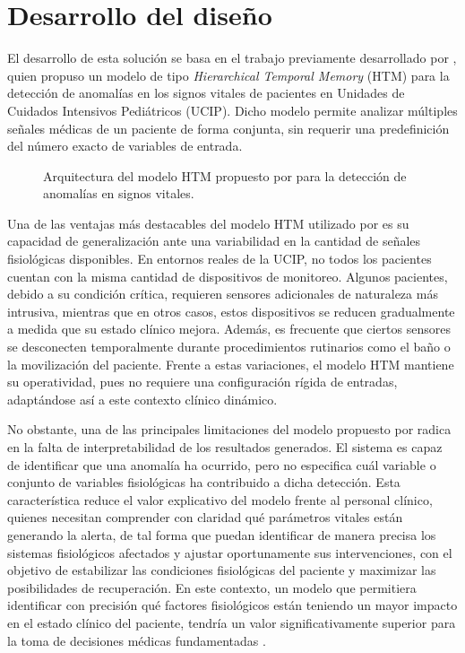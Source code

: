 \chapter{Desarrollo del diseño}

El desarrollo de esta solución se basa en el trabajo previamente desarrollado por \textcite{Vargas2023}, quien propuso un modelo de tipo \textit{Hierarchical Temporal Memory }(HTM) para la detección de anomalías en los signos vitales de pacientes en Unidades de Cuidados Intensivos Pediátricos (UCIP). Dicho modelo permite analizar múltiples señales médicas de un paciente de forma conjunta, sin requerir una predefinición del número exacto de variables de entrada.

\begin{figure}[H]
  \centering
  
  \captionsetup{justification=centering}
  \caption{Arquitectura del modelo HTM propuesto por \textcite{Vargas2023} para la detección de anomalías en signos vitales.}
  \label{fig:arquitectura_original}
\end{figure}

Una de las ventajas más destacables del modelo HTM utilizado por \textcite{Vargas2023} es su capacidad de generalización ante una variabilidad en la cantidad de señales fisiológicas disponibles. En entornos reales de la UCIP, no todos los pacientes cuentan con la misma cantidad de dispositivos de monitoreo. Algunos pacientes, debido a su condición crítica, requieren sensores adicionales de naturaleza más intrusiva, mientras que en otros casos, estos dispositivos se reducen gradualmente a medida que su estado clínico mejora. Además, es frecuente que ciertos sensores se desconecten temporalmente durante procedimientos rutinarios como el baño o la movilización del paciente. Frente a estas variaciones, el modelo HTM mantiene su operatividad, pues no requiere una configuración rígida de entradas, adaptándose así a este contexto clínico dinámico.

No obstante, una de las principales limitaciones del modelo propuesto por \textcite{Vargas2023} radica en la falta de interpretabilidad de los resultados generados. El sistema es capaz de identificar que una anomalía ha ocurrido, pero no especifica cuál variable o conjunto de variables fisiológicas ha contribuido a dicha detección. Esta característica reduce el valor explicativo del modelo frente al personal clínico, quienes necesitan comprender con claridad qué parámetros vitales están generando la alerta, de tal forma que puedan identificar de manera precisa los sistemas fisiológicos afectados y ajustar oportunamente sus intervenciones, con el objetivo de estabilizar las condiciones fisiológicas del paciente y maximizar las posibilidades de recuperación. En este contexto, un modelo que permitiera identificar con precisión qué factores fisiológicos están teniendo un mayor impacto en el estado clínico del paciente, tendría un valor significativamente superior para la toma de decisiones médicas fundamentadas \parencite{zhang2023interpretable}.

